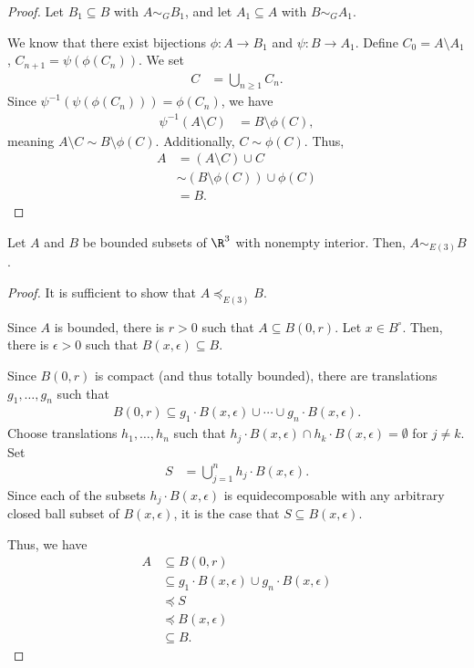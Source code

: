 \documentclass[12pt]{mypackage}
\begin{document}
\begin{proof}
  Let $B_1\subseteq B$ with $A\sim_{G} B_1$, and let $A_1\subseteq A$ with $B\sim_{G} A_1$.\newline

  We know that there exist bijections $\phi: A\rightarrow B_1$ and $\psi: B\rightarrow A_1$. Define $C_0 = A\setminus A_1$, $C_{n+1} = \psi\left(\phi\left(C_n\right)\right)$. We set
  \begin{align*}
    C &= \bigcup_{n\geq 1} C_n.
  \end{align*}
  Since $\psi^{-1}\left(\psi\left(\phi\left(C_n\right)\right)\right) = \phi\left(C_n\right)$, we have
  \begin{align*}
    \psi^{-1}\left(A\setminus C\right) &= B\setminus \phi(C),
  \end{align*}
  meaning $A\setminus C \sim B\setminus \phi(C)$. Additionally, $C\sim \phi(C)$. Thus,
  \begin{align*}
    A &= \left(A\setminus C\right)\cup C\\
      &\sim \left(B\setminus \phi(C)\right) \cup \phi(C)\\
      &= B.
  \end{align*}
\end{proof}
\begin{theorem}
  Let $A$ and $B$ be bounded subsets of $\R^3$ with nonempty interior. Then, $A \sim_{E(3)} B$.
\end{theorem}
\begin{proof}
  It is sufficient to show that $A\preceq_{E(3)} B$.\newline

  Since $A$ is bounded, there is $r > 0$ such that $A\subseteq B(0,r)$. Let $x\in B^{\circ}$. Then, there is $\epsilon > 0$ such that $B(x,\epsilon)\subseteq B$.\newline

  Since $B(0,r)$ is compact (and thus totally bounded), there are translations $g_1,\dots,g_n$ such that
  \begin{align*}
    B(0,r)\subseteq g_1\cdot B(x,\epsilon) \cup \cdots \cup g_n\cdot B(x,\epsilon).
  \end{align*}
  Choose translations $h_1,\dots,h_n$ such that $h_j\cdot B(x,\epsilon)\cap h_k\cdot B(x,\epsilon) = \emptyset$ for $j\neq k$. Set
  \begin{align*}
    S &= \bigcup_{j=1}^{n}h_j\cdot B(x,\epsilon).
  \end{align*}
  Since each of the subsets $h_j\cdot B(x,\epsilon)$ is equidecomposable with any arbitrary closed ball subset of $B(x,\epsilon)$, it is the case that $S\subseteq B(x,\epsilon)$.\newline

  Thus, we have
  \begin{align*}
    A &\subseteq B(0,r)\\
      &\subseteq g_1\cdot B(x,\epsilon)\cup g_n\cdot B(x,\epsilon)\\
      &\preceq S\\
      &\preceq B(x,\epsilon)\\
      &\subseteq B.
  \end{align*}
\end{proof}
\end{document}
